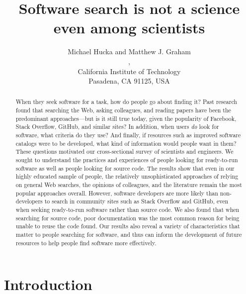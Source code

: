 \documentclass{casicswhitepaper}
\begin{document}
\title{\vspace*{-5ex}Software search is not a science even among scientists}
\date{\vspace*{-1ex}\dateAndVersion}
\author{Michael Hucka and Matthew J. Graham\\
,\quad{}\\
California Institute of Technology\\
Pasadena, CA 91125, USA}
\maketitle

\begin{abstract}
  When they seek software for a task, how do people go about finding it?  Past research found that searching the Web, asking colleagues, and reading papers have been the predominant approaches---but is it still true today, given the popularity of Facebook, Stack Overflow, GitHub, and similar sites?  In addition, when users \emph{do} look for software, what criteria do they use?  And finally, if resources such as improved software catalogs were to be developed, what kind of information would people want in them?  These questions motivated our cross-sectional survey of scientists and engineers.  We sought to understand the practices and experiences of people looking for ready-to-run software as well as people looking for source code.  The results show that even in our highly educated sample of people, the relatively unsophisticated approaches of relying on general Web searches, the opinions of colleagues, and the literature remain the most popular approaches overall.  However, software developers are more likely than non-developers to search in community sites such as Stack Overflow and GitHub, even when seeking ready-to-run software rather than source code.  We also found that when searching for source code, poor documentation was the most common reason for being unable to reuse the code found.  Our results also reveal a variety of characteristics that matter to people searching for software, and thus can inform the development of future resources to help people find software more effectively.
\end{abstract}


\section{Introduction}
\end{document}
